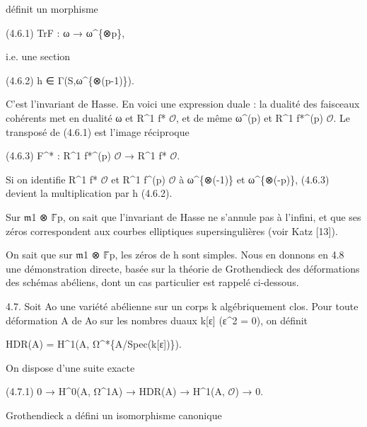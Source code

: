 \documentclass[11pt,a4paper]{article}
\begin{document}
définit un morphisme

(4.6.1)        Tr\textunderscore{}F : ω → ω\textasciicircum{}\{⊗p\},

i.e. une section

(4.6.2)        h ∈ Γ(S,ω\textasciicircum{}\{⊗(p-1)\}).

C'est l'invariant de Hasse. En voici une expression duale : la dualité des faisceaux cohérents met en dualité ω et R\textasciicircum{}1 f\textunderscore{}* \ensuremath{\mathcal{O}}, et de même ω\textasciicircum{}(p) et R\textasciicircum{}1 f\textunderscore{}*\textasciicircum{}(p) \ensuremath{\mathcal{O}}. Le transposé de (4.6.1) est l'image réciproque

(4.6.3)        F\textasciicircum{}* : R\textasciicircum{}1 f\textunderscore{}*\textasciicircum{}(p) \ensuremath{\mathcal{O}} → R\textasciicircum{}1 f\textunderscore{}* \ensuremath{\mathcal{O}}.

Si on identifie R\textasciicircum{}1 f\textunderscore{}* \ensuremath{\mathcal{O}} et R\textasciicircum{}1 f\textasciicircum{}(p) \ensuremath{\mathcal{O}} à ω\textasciicircum{}\{⊗(-1)\} et ω\textasciicircum{}\{⊗(-p)\}, (4.6.3) devient la multiplication par h (4.6.2).

Sur \ensuremath{\mathfrak{m}}\textunderscore{}1 ⊗ \ensuremath{\mathbb{F}}̄\textunderscore{}p, on sait que l'invariant de Hasse ne s'annule pas à l'infini, et que ses zéros correspondent aux courbes elliptiques supersingulières (voir Katz [13]).

On sait que sur \ensuremath{\mathfrak{m}}\textunderscore{}1 ⊗ \ensuremath{\mathbb{F}}̄\textunderscore{}p, les zéros de h sont simples. Nous en donnons en 4.8 une démonstration directe, basée sur la théorie de Grothendieck des déformations des schémas abéliens, dont un cas particulier est rappelé ci-dessous.

4.7. Soit A\textunderscore{}o une variété abélienne sur un corps k algébriquement clos. Pour toute déformation A de A\textunderscore{}o sur les nombres duaux k[ε] (ε\textasciicircum{}2 = 0), on définit

H\textunderscore{}DR(A) = H\textasciicircum{}1(A, Ω\textasciicircum{}*\textunderscore{}\{A/Spec(k[ε])\}).

On dispose d'une suite exacte

(4.7.1)        0 → H\textasciicircum{}0(A, Ω\textasciicircum{}1\textunderscore{}A) → H\textunderscore{}DR(A) → H\textasciicircum{}1(A, \ensuremath{\mathcal{O}}) → 0.

Grothendieck a défini un isomorphisme canonique
\end{document}
